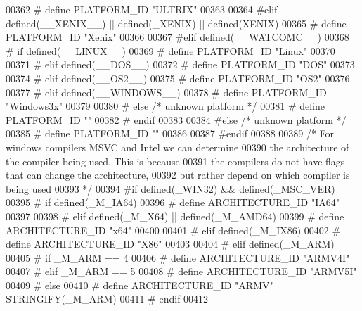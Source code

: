 \begin{DoxyCode}
{{{{{{{{{{{{{{{{{{{{{{{{{{{{{{{{{{{{00362 \textcolor{preprocessor}{# define PLATFORM\_ID "ULTRIX"}
00363 
00364 \textcolor{preprocessor}{#elif defined(\_\_XENIX\_\_) || defined(\_XENIX) || defined(XENIX)}
00365 \textcolor{preprocessor}{# define PLATFORM\_ID "Xenix"}
00366 
00367 \textcolor{preprocessor}{#elif defined(\_\_WATCOMC\_\_)}
00368 \textcolor{preprocessor}{# if defined(\_\_LINUX\_\_)}
00369 \textcolor{preprocessor}{#  define PLATFORM\_ID "Linux"}
00370 
00371 \textcolor{preprocessor}{# elif defined(\_\_DOS\_\_)}
00372 \textcolor{preprocessor}{#  define PLATFORM\_ID "DOS"}
00373 
00374 \textcolor{preprocessor}{# elif defined(\_\_OS2\_\_)}
00375 \textcolor{preprocessor}{#  define PLATFORM\_ID "OS2"}
00376 
00377 \textcolor{preprocessor}{# elif defined(\_\_WINDOWS\_\_)}
00378 \textcolor{preprocessor}{#  define PLATFORM\_ID "Windows3x"}
00379 
00380 \textcolor{preprocessor}{# else }\textcolor{comment}{/* unknown platform */}\textcolor{preprocessor}{}
00381 \textcolor{preprocessor}{#  define PLATFORM\_ID ""}
00382 \textcolor{preprocessor}{# endif}
00383 
00384 \textcolor{preprocessor}{#else }\textcolor{comment}{/* unknown platform */}\textcolor{preprocessor}{}
00385 \textcolor{preprocessor}{# define PLATFORM\_ID ""}
00386 
00387 \textcolor{preprocessor}{#endif}
00388 
00389 \textcolor{comment}{/* For windows compilers MSVC and Intel we can determine}
00390 \textcolor{comment}{   the architecture of the compiler being used.  This is because}
00391 \textcolor{comment}{   the compilers do not have flags that can change the architecture,}
00392 \textcolor{comment}{   but rather depend on which compiler is being used}
00393 \textcolor{comment}{*/}
00394 \textcolor{preprocessor}{#if defined(\_WIN32) && defined(\_MSC\_VER)}
00395 \textcolor{preprocessor}{# if defined(\_M\_IA64)}
00396 \textcolor{preprocessor}{#  define ARCHITECTURE\_ID "IA64"}
00397 
00398 \textcolor{preprocessor}{# elif defined(\_M\_X64) || defined(\_M\_AMD64)}
00399 \textcolor{preprocessor}{#  define ARCHITECTURE\_ID "x64"}
00400 
00401 \textcolor{preprocessor}{# elif defined(\_M\_IX86)}
00402 \textcolor{preprocessor}{#  define ARCHITECTURE\_ID "X86"}
00403 
00404 \textcolor{preprocessor}{# elif defined(\_M\_ARM)}
00405 \textcolor{preprocessor}{#  if \_M\_ARM == 4}
00406 \textcolor{preprocessor}{#   define ARCHITECTURE\_ID "ARMV4I"}
00407 \textcolor{preprocessor}{#  elif \_M\_ARM == 5}
00408 \textcolor{preprocessor}{#   define ARCHITECTURE\_ID "ARMV5I"}
00409 \textcolor{preprocessor}{#  else}
00410 \textcolor{preprocessor}{#   define ARCHITECTURE\_ID "ARMV" STRINGIFY(\_M\_ARM)}
00411 \textcolor{preprocessor}{#  endif}
00412 
}}}}}}}}}}}}}}}}}}}}}}}}}}}}}}}}}}}}
\end{DoxyCode}

